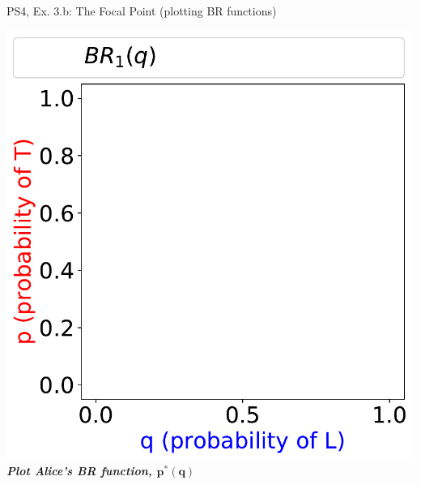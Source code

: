 \begin{frame}{PS4, Ex. 3.b: The Focal Point (plotting BR functions)}
\begin{multicols}{2}
    \vfill\null \columnbreak
    \includegraphics[width=\columnwidth]{figures/empty_plot_}
    \textbf{\textit{Plot Alice's BR function, $\bm{p^{*}(q)}$}}
  \vfill\null
  \end{multicols}
\end{frame}
